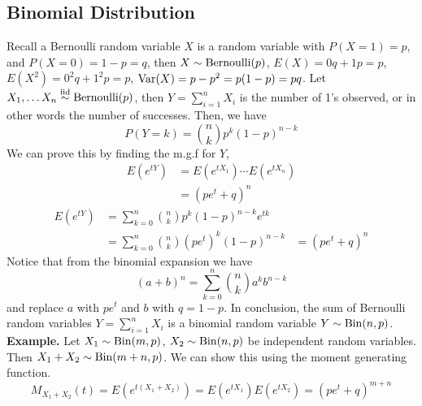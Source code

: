 \subsection*{Binomial Distribution}
Recall a Bernoulli random variable $X$ is a random variable with $P(X = 1) = p$, and $P(X = 0) = 1 - p = q$, then $X \sim \operatorname{Bernoulli}(p)$, $E(X) = 0q + 1p = p$, $E(X^2) = 0^2q + 1^2p = p$, $\operatorname{Var}(X) = p - p^2 = p(1 - p) = pq$. Let $X_1, \ldots X_n \overset{\mathrm{iid}}{\sim} \operatorname{Bernoulli}(p)$, then $Y = \sum\limits_{i=1}^n X_i$ is the number of 1's observed, or in other words the number of successes. Then, we have 
\[P(Y = k) = {n \choose k}p^k (1-p)^{n-k}\]
We can prove this by finding the m.g.f for $Y$, 
\begin{align*}
    E(e^{tY}) &= E(e^{tX_1})\cdots E(e^{tX_n})\\
    &= (pe^t + q)^n
\end{align*}
\begin{align*}
    E(e^{tY}) &= \sum_{k=0}^n {n \choose k} p^k(1-p)^{n-k}e^{tk}\\
    &= \sum_{k=0}^n {n \choose k} (pe^t)^k(1-p)^{n-k} 
    &= (pe^t + q)^n
\end{align*}
Notice that from the binomial expansion we have 
\[(a+b)^n = \sum_{k=0}^n {n \choose k}a^kb^{n-k}\]
and replace $a$ with $pe^t$ and $b$ with $q = 1-p$. In conclusion, the sum of Bernoulli random variables $Y = \sum\limits_{i=1}^n X_i$ is a binomial random variable $Y \sim \operatorname{Bin}(n,p)$.\\[2ex]
\textbf{Example.} Let $X_1 \sim \operatorname{Bin}(m,p)$, $X_2 \sim \operatorname{Bin}(n,p)$ be independent random variables. Then $X_1 + X_2 \sim \operatorname{Bin}(m+n, p)$. We can show this using the moment generating function.
\[M_{X_1 + X_2}(t) = E(e^{t(X_1 + X_2)}) = E(e^{tX_1})E(e^{tX_2}) = (pe^t+q)^{m+n}\]
